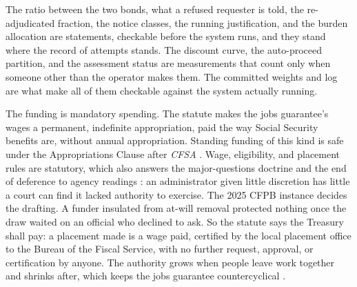 The ratio between the two bonds, what a refused requester is told, the re-adjudicated fraction, the notice classes, the running justification, and the burden allocation are statements, checkable before the system runs, and they stand where the record of attempts stands. The discount curve, the auto-proceed partition, and the assessment status are measurements that count only when someone other than the operator makes them. The committed weights and log are what make all of them checkable against the system actually running.


The funding is mandatory spending. The statute makes the jobs guarantee's wages a permanent, indefinite appropriation, paid the way Social Security benefits are, without annual appropriation. Standing funding of this kind is safe under the Appropriations Clause after \emph{CFSA} \autocite{cfpb2024cfsa}. Wage, eligibility, and placement rules are statutory, which also answers the major-questions doctrine and the end of deference to agency readings \autocite{westvirginia2022,loperbright2024}: an administrator given little discretion has little a court can find it lacked authority to exercise. The 2025 CFPB instance decides the drafting. A funder insulated from at-will removal protected nothing once the draw waited on an official who declined to ask. So the statute says the Treasury shall pay: a placement made is a wage paid, certified by the local placement office to the Bureau of the Fiscal Service, with no further request, approval, or certification by anyone. The authority grows when people leave work together and shrinks after, which keeps the jobs guarantee countercyclical \autocite{tcherneva2020case}.

